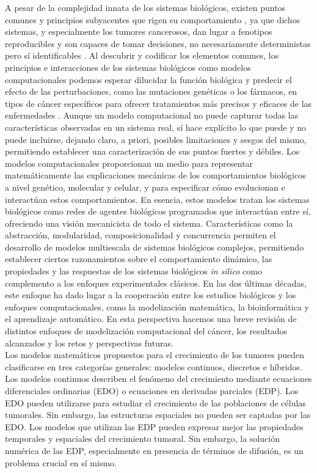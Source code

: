 A pesar de la complejidad innata de los sistemas biológicos, existen puntos comunes y principios subyacentes que rigen su comportamiento \cite{Hartwell1999}, ya que dichos sistemas, y especialmente los tumores cancerosos, dan lugar a fenotipos reproducibles y son capaces de tomar decisiones, no necesariamente deterministas pero sí identificables \cite{Hartman2001, Siegal2002}. Al descubrir y codificar los elementos comunes, los principios e interacciones de los sistemas biológicos como modelos computacionales podemos esperar dilucidar la función biológica y predecir el efecto de las perturbaciones, como las mutaciones genéticas o los fármacos, en tipos de cáncer específicos para ofrecer tratamientos más precisos y eficaces de las enfermedades \cite{DiVentura2006}. Aunque un modelo computacional no puede capturar todas las características observadas en un sistema real, sí hace explícito lo que puede y no puede incluirse, dejando claro, a priori, posibles limitaciones y sesgos del mismo, permitiendo establecer una caracterización de sus puntos fuertes y débiles. Los modelos computacionales proporcionan un medio para representar matemáticamente las explicaciones mecánicas de los comportamientos biológicos a nivel genético, molecular y celular, y para especificar cómo evolucionan e interactúan estos comportamientos. En esencia, estos modelos tratan los sistemas biológicos como redes de agentes biológicos programados que interactúan entre sí, ofreciendo una visión mecanicista de todo el sistema. Características como la abstracción, modularidad, composicionalidad y concurrencia permiten el desarrollo de modelos multiescala de sistemas biológicos complejos, permitiendo establecer ciertos razonamientos sobre el comportamiento dinámico, las propiedades y las respuestas de los sistemas biológicos \textit{in silico} como complemento a los enfoques experimentales clásicos. En las dos últimas décadas, este enfoque ha dado lugar a la cooperación entre los estudios biológicos y los enfoques computacionales, como la modelización matemática, la bioinformática y el aprendizaje automático. En esta perspectiva hacemos una breve revisión de distintos enfoques de modelización computacional del cáncer, los resultados alcanzados y los retos y perspectivas futuras.\\

Los modelos matemáticos propuestos para el crecimiento de los tumores pueden clasificarse en tres categorías generales: modelos continuos, discretos e híbridos. Los modelos continuos describen el fenómeno del crecimiento mediante ecuaciones diferenciales ordinarias (EDO) o ecuaciones en derivadas parciales (EDP). Los EDO pueden utilizarse para estudiar el crecimiento de las poblaciones de células tumorales. Sin embargo, las estructuras espaciales no pueden ser captadas por las EDO. Los modelos que utilizan las EDP pueden expresar mejor las propiedades temporales y espaciales del crecimiento tumoral. Sin embargo, la solución numérica de las EDP, especialmente en presencia de términos de difusión, es un problema crucial en sí mismo.\\

